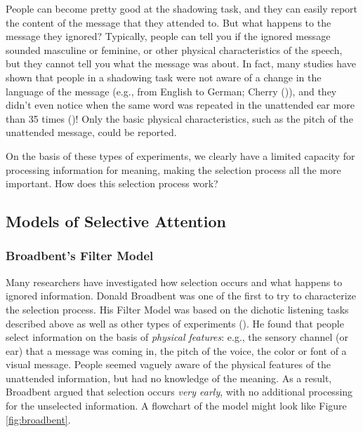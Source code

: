\documentclass[
]{krantz}
\begin{document}
People can become pretty good at the shadowing task, and they can easily report the content of the message that they attended to. But what happens to the message they ignored? Typically, people can tell you if the ignored message sounded masculine or feminine, or other physical characteristics of the speech, but they cannot tell you what the message was about. In fact, many studies have shown that people in a shadowing task were not aware of a change in the language of the message (e.g., from English to German; Cherry ()), and they didn't even notice when the same word was repeated in the unattended ear more than 35 times ()! Only the basic physical characteristics, such as the pitch of the unattended message, could be reported.

On the basis of these types of experiments, we clearly have a limited capacity for processing information for meaning, making the selection process all the more important. How does this selection process work?

\subsection*{Models of Selective Attention}\label{models-of-selective-attention}


\subsubsection*{Broadbent's Filter Model}\label{broadbents-filter-model}


Many researchers have investigated how selection occurs and what happens to ignored information. Donald Broadbent was one of the first to try to characterize the selection process. His Filter Model was based on the dichotic listening tasks described above as well as other types of experiments (). He found that people select information on the basis of \emph{physical features}: e.g., the sensory channel (or ear) that a message was coming in, the pitch of the voice, the color or font of a visual message. People seemed vaguely aware of the physical features of the unattended information, but had no knowledge of the meaning. As a result, Broadbent argued that selection occurs \emph{very early}, with no additional processing for the unselected information. A flowchart of the model might look like Figure \ref{fig:broadbent}.
\end{document}
